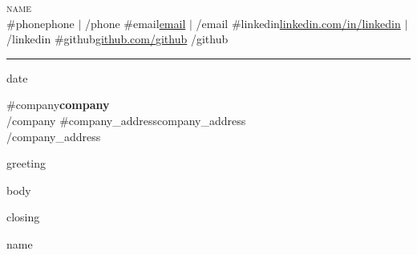 \documentclass[letterpaper,10pt]{article}
\begin{document}
\begin{center}
  {\Large \scshape {{name}}}\\\vspace{2pt}
  \footnotesize
  {{#phone}}{{phone}} $|$ {{/phone}}
  {{#email}}\href{mailto:{{email}}}{{{email}}} $|$ {{/email}}
  {{#linkedin}}\href{https://linkedin.com/in/{{linkedin}}}{linkedin.com/in/{{linkedin}}} $|$ {{/linkedin}}
  {{#github}}\href{https://github.com/{{github}}}{github.com/{{github}}}
  {{/github}}
\end{center}

\vspace{4pt}
\hrule
\vspace{12pt}

\footnotesize {{date}}

\vspace{6pt}

\footnotesize
{{#company}}\textbf{{{company}}}\\{{/company}}
{{#company_address}}{{{company_address}}}\\{{/company_address}}

\vspace{12pt}

\small {{greeting}}

\vspace{6pt}

\small
{{body}}

\vspace{12pt}

\small {{closing}}

\vspace{24pt}

\small {{name}}
\end{document}
